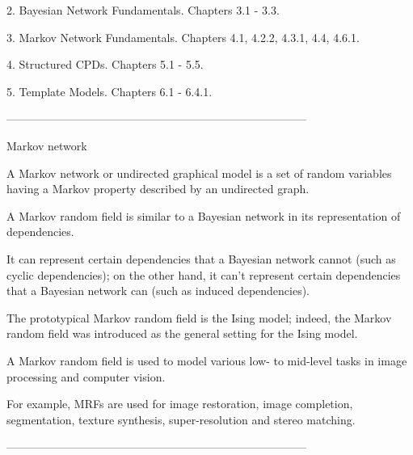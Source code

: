 2.
Bayesian Network Fundamentals. Chapters 3.1 - 3.3.

3.
Markov Network Fundamentals. Chapters 4.1, 4.2.2, 4.3.1, 4.4, 4.6.1.

4.
Structured CPDs. Chapters 5.1 - 5.5.

5.
Template Models. Chapters 6.1 - 6.4.1.





--------------------------------------------------------------------------------


Markov network


A Markov network or undirected graphical model is a set of random variables having a Markov property described by an undirected graph.


A Markov random field is similar to a Bayesian network in its representation of dependencies. 

It can represent certain dependencies that a Bayesian network cannot (such as cyclic dependencies); on the other hand, it can't represent certain dependencies that a Bayesian network can (such as induced dependencies). 


The prototypical Markov random field is the Ising model; indeed, the Markov random field was introduced as the general setting for the Ising model. 


A Markov random field is used to model various low- to mid-level tasks in image processing and computer vision.


For example, MRFs are used for image restoration, image completion, segmentation, texture synthesis, super-resolution and stereo matching.




--------------------------------------------------------------------------------


